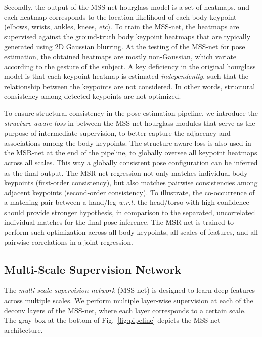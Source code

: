 \documentclass[runningheads]{llncs}
\begin{document}
Secondly, the output of the MSS-net hourglass model is a set of heatmaps, and each heatmap corresponds to the location likelihood of each body keypoint (elbows, wrists, ankles, knees, {\em etc}). 
To train the MSS-net, the heatmaps are supervised against the ground-truth body keypoint heatmaps that are typically generated using 2D Gaussian blurring.
At the testing of the MSS-net for pose estimation, the obtained heatmaps are mostly non-Gaussian, which variate according to the gesture of the subject. 
A key deficiency in the original hourglass model \cite{newell2016stacked} is that each keypoint heatmap is estimated {\em independently}, such that the relationship between the keypoints are not considered. In other words, structural consistency among detected keypoints are not optimized. 

To ensure structural consistency in the pose estimation pipeline, we introduce the {\em structure-aware loss} in between the MSS-net hourglass modules that serve as the purpose of intermediate supervision, to better capture the adjacency and associations among the body keypoints. 
The structure-aware loss is also used in the MSR-net at the end of the pipeline, to globally oversee all keypoint heatmaps across all scales.
This way a globally consistent pose configuration can be inferred as the final output. 
The MSR-net regression not only matches individual body keypoints (first-order consistency), but also matches pairwise consistencies among adjacent keypoints (second-order consistency). To illustrate, the co-occurrence of a matching pair between a hand/leg {\em w.r.t.} the head/torso with high confidence should provide stronger hypothesis, in comparison to the separated, uncorrelated individual matches for the final pose inference. 
The MSR-net is trained to perform such optimization across all body keypoints, all scales of features, and all pairwise correlations in a joint regression.


\subsection{Multi-Scale Supervision Network}
\label{sec:multiscale:supervision}

The {\em multi-scale supervision network} (MSS-net) is designed to learn deep features across multiple scales.
We perform multiple layer-wise supervision at each of the deconv layers of the MSS-net, where each layer corresponds to a certain scale.
The gray box at the bottom of Fig.~\ref{fig:pipeline} depicts the MSS-net architecture.
\end{document}

